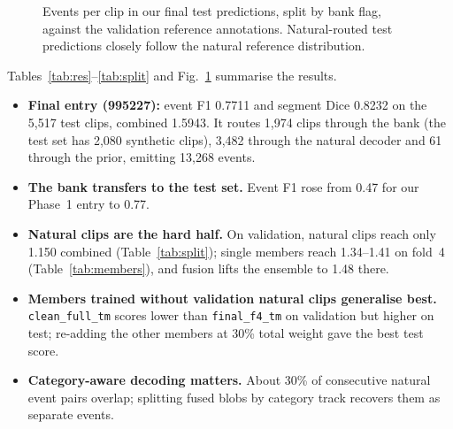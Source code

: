 \documentclass[conference]{IEEEtran}
\begin{document}
\begin{figure}[t]
\centering
{}
\caption{Events per clip in our final test predictions, split by bank flag, against the validation reference
annotations. Natural-routed test predictions closely follow the natural reference distribution.}
\label{fig:hist}
\end{figure}

Tables~\ref{tab:res}--\ref{tab:split} and Fig.~\ref{fig:hist} summarise the results.
\begin{itemize}
\item \textbf{Final entry (995227):} event F1 0.7711 and segment Dice 0.8232 on the 5,517 test clips, combined
1.5943. It routes 1,974 clips through the bank (the test set has 2,080 synthetic clips), 3,482 through the natural
decoder and 61 through the prior, emitting 13,268 events.
\item \textbf{The bank transfers to the test set.} Event F1 rose from 0.47 for our Phase~1 entry to 0.77.
\item \textbf{Natural clips are the hard half.} On validation, natural clips reach only 1.150 combined
(Table~\ref{tab:split}); single members reach 1.34--1.41 on fold~4 (Table~\ref{tab:members}), and fusion lifts
the ensemble to 1.48 there.
\item \textbf{Members trained without validation natural clips generalise best.} \texttt{clean\_full\_tm} scores
lower than \texttt{final\_f4\_tm} on validation but higher on test; re-adding the other members at 30\% total weight
gave the best test score.
\item \textbf{Category-aware decoding matters.} About 30\% of consecutive natural event pairs overlap; splitting
fused blobs by category track recovers them as separate events.
\end{itemize}
\end{document}
